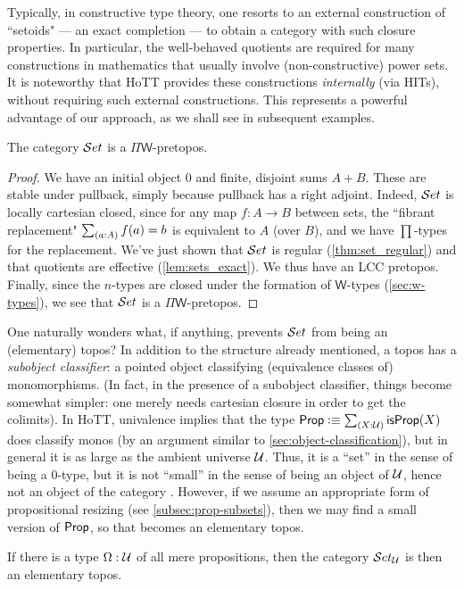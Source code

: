 Typically, in constructive type theory, one resorts to an external construction of ``setoids" --- an exact completion --- to obtain a category with such closure properties.  In particular, the well-behaved quotients are required for many constructions in mathematics that usually involve (non-constructive) power sets.  It is noteworthy that HoTT  provides these constructions \emph{internally} (via HITs), without requiring such external constructions.  This represents a powerful advantage of our approach, as we shall see in subsequent examples.

\begin{thm} The category $\mathcal{S}et$ is a $\Pi\mathsf{W}$-pretopos.
\end{thm}
\begin{proof}
We have an initial object $0$ and finite, disjoint sums $A+B$.  These are stable under pullback, simply because pullback has a right adjoint.  Indeed, $\mathcal{S}et$ is locally cartesian closed, since for any map $f:A\to B$ between sets, the ``fibrant replacement" $\sm{a:A}f(a)=b$ is equivalent to $A$ (over $B$), and we have $\prod$-types for the replacement.
We've just shown that $\mathcal{S}et$ is regular (\autoref{thm:set_regular}) and that quotients are effective (\autoref{lem:sets_exact}). We thus have an LCC pretopos. Finally, since the $n$-types are closed under the formation of $\mathsf{W}$-types
(\autoref{sec:w-types}), we see that $\mathcal{S}et$ is a $\Pi\mathsf{W}$-pretopos. 
\end{proof}

One naturally wonders what, if anything, prevents $\mathcal{S}et$ from being an (elementary) topos?
In addition to the structure already mentioned, a topos has a
\emph{subobject classifier}: a pointed object classifying (equivalence classes of) monomorphisms.  (In fact, in the presence of a subobject
classifier, things become somewhat simpler: one merely needs cartesian closure in order to get the colimits).
In HoTT, univalence implies that the type $\prop \defeq \sm{X:\UU}\isprop(X)$ does classify monos (by an argument similar to \autoref{sec:object-classification}), but in general it is as large as the ambient universe $\mathcal{U}$.
Thus, it is a ``set'' in the sense of being a $0$-type, but it is not ``small'' in the sense of being an object of $\mathcal{U}$, hence not an object of the category \uset.
However, if we assume an appropriate form of propositional resizing (see \autoref{subsec:prop-subsets}), then we may find a small version of $\mathsf{Prop}$, so that \uset becomes an elementary topos.

\begin{thm}\label{thm:settopos}
  If there is a type $\Omega:\mathcal{U}$ of all mere propositions, then the category $\mathcal{S}et_\mathcal{U}$ is then an elementary topos.
\end{thm}

